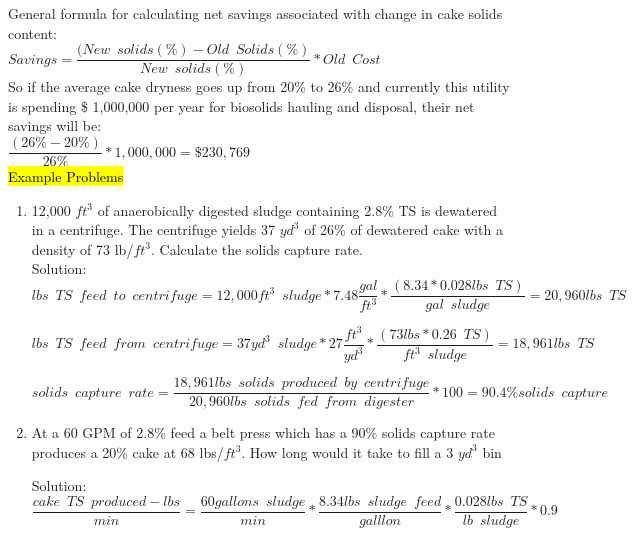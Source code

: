 General formula for calculating net savings associated with change in cake solids content:\\
$Savings = \dfrac{(New \enspace solids(\%) - Old \enspace Solids(\%)}{New \enspace solids(\%)}*Old \enspace Cost$\\
So if the average cake dryness goes up from 20\% to 26\% and currently this utility is spending \$ 1,000,000 per
year for biosolids hauling and disposal, their net savings will be:\\
$\dfrac{(26\%-20\%)}{26\%}* 1,000,000 = \$230,769$\\
\hl{Example Problems}\\
\begin{enumerate}[1.]


\item 12,000 $ft^3$ of anaerobically digested sludge containing 2.8\% TS is dewatered in a centrifuge.  The centrifuge yields 37 $yd^3$ of 26\% of dewatered cake with a density of 73 lb/$ft^3$.  Calculate the solids capture rate.\\


 

Solution:\\
$
    lbs \enspace TS \enspace feed \enspace to \enspace centrifuge
    =
    12,000 ft^3 \enspace sludge
    *
    7.48 
    \dfrac
    {
    gal
    }
    {
    ft^3
    }
    *
    \dfrac
    {
    (8.34*0.028 lbs \enspace TS )
    }
    {gal \enspace sludge
    }
    =20,960 {lbs \enspace TS}
$

$
    lbs \enspace TS \enspace feed \enspace from \enspace centrifuge
    =
    37 yd^3 \enspace sludge
    *
    27 
    \dfrac
    {
    ft^3
    }
    {
    yd^3
    }
    *
    \dfrac
    {
    (73 lbs *0.26 \enspace TS )
    }
    {ft^3 \enspace sludge
    }
    =18,961 {lbs \enspace TS}
$

$
    solids \enspace capture \enspace rate
    =
    \dfrac
    {
    18,961 lbs \enspace solids \enspace produced        \enspace by \enspace centrifuge
    }
    {
    20,960 lbs \enspace solids \enspace fed             \enspace from \enspace digester
    }
    *
    100 
    =\boxed
    {
    90.4\% solids \enspace capture
    }
$


\item At a 60 GPM of 2.8\% feed a belt press which has a 90\% solids capture rate produces a 20\% cake at 68 lbs/$ft^3$.  How long would it take to fill a 3 $yd^3$ bin  
    
    
Solution:\\
{$\dfrac{cake \enspace TS \enspace produced - lbs}{min}= \dfrac {60 gallons \enspace sludge}{min}*\dfrac {8.34 lbs \enspace sludge \enspace feed}{galllon}*\dfrac{0.028 lbs \enspace TS}{lb \enspace sludge}*0.9$}\\
\vspace{3mm}


\end{enumerate}

